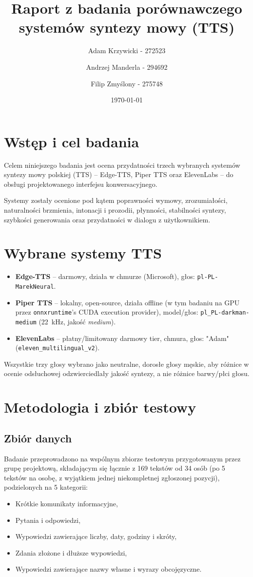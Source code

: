 \documentclass{article}
\title{Raport z badania porównawczego systemów syntezy mowy (TTS)}
\author{Adam Krzywicki - 272523 \and Andrzej Manderla - 294692 \and Filip Zmyślony - 275748}
\date{\today}
\begin{document}
\maketitle

\section{Wstęp i cel badania}
Celem niniejszego badania jest ocena przydatności trzech wybranych systemów syntezy mowy
polskiej (TTS) -- Edge-TTS, Piper TTS oraz ElevenLabs -- do obsługi projektowanego interfejsu
konwersacyjnego.

Systemy zostały ocenione pod kątem poprawności wymowy, zrozumiałości, naturalności brzmienia,
intonacji i prozodii, płynności, stabilności syntezy, szybkości generowania oraz przydatności
w dialogu z użytkownikiem.

\section{Wybrane systemy TTS}
\begin{itemize}
    \item \textbf{Edge-TTS} -- darmowy, działa w chmurze (Microsoft), głos: \texttt{pl-PL-MarekNeural}.
    \item \textbf{Piper TTS} -- lokalny, open-source, działa offline (w tym badaniu na GPU przez
    \texttt{onnxruntime}'s CUDA execution provider), model/głos: \texttt{pl\_PL-darkman-medium}
    (22~kHz, jakość \textit{medium}).
    \item \textbf{ElevenLabs} -- płatny/limitowany darmowy tier, chmura, głos: "Adam"
    (\texttt{eleven\_multilingual\_v2}).
\end{itemize}
Wszystkie trzy głosy wybrano jako neutralne, dorosłe głosy męskie, aby różnice w ocenie
odsłuchowej odzwierciedlały jakość syntezy, a nie różnice barwy/płci głosu.

\section{Metodologia i zbiór testowy}
\subsection{Zbiór danych}
Badanie przeprowadzono na wspólnym zbiorze testowym przygotowanym przez grupę projektową,
składającym się łącznie z 169 tekstów od 34 osób (po 5 tekstów na osobę, z wyjątkiem jednej
niekompletnej zgłoszonej pozycji), podzielonych na 5 kategorii:
\begin{itemize}
    \item Krótkie komunikaty informacyjne,
    \item Pytania i odpowiedzi,
    \item Wypowiedzi zawierające liczby, daty, godziny i skróty,
    \item Zdania złożone i dłuższe wypowiedzi,
    \item Wypowiedzi zawierające nazwy własne i wyrazy obcojęzyczne.
\end{itemize}
\end{document}
